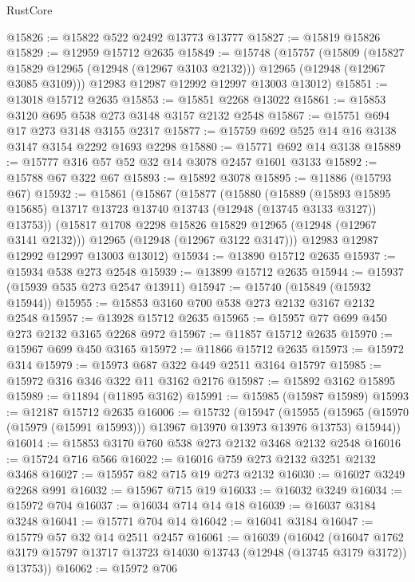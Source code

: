 \begin{lexlean}{RustCore}
\begin{coremodule}
@15826 := @15822 @522 @2492 @13773 @13777
@15827 := @15819 @15826
@15829 := @12959 @15712 @2635
@15849 := @15748
    (@15757
      (@15809
        (@15827 @15829 @12965 (@12948 (@12967 @3103 @2132)))
        @12965
        (@12948 (@12967 @3085 @3109)))
      @12983
      @12987
      @12992
      @12997
      @13003
      @13012)
@15851 := @13018 @15712 @2635
@15853 := @15851 @2268 @13022
@15861 := @15853 @3120 @695 @538 @273 @3148 @3157 @2132 @2548
@15867 := @15751 @694 @17 @273 @3148 @3155 @2317
@15877 := @15759 @692 @525 @14 @16 @3138 @3147 @3154 @2292 @1693 @2298
@15880 := @15771 @692 @14 @3138
@15889 := @15777 @316 @57 @52 @32 @14 @3078 @2457 @1601 @3133
@15892 := @15788 @67 @322 @67
@15893 := @15892 @3078
@15895 := @11886 (@15793 @67)
@15932 := @15861
    (@15867
      (@15877
        (@15880
          (@15889
            (@15893 @15895 @15685)
            @13717
            @13723
            @13740
            @13743
            (@12948 (@13745 @3133 @3127))
            @13753))
        (@15817 @1708 @2298 @15826 @15829 @12965 (@12948 (@12967 @3141 @2132)))
        @12965
        (@12948 (@12967 @3122 @3147)))
      @12983
      @12987
      @12992
      @12997
      @13003
      @13012)
@15934 := @13890 @15712 @2635
@15937 := @15934 @538 @273 @2548
@15939 := @13899 @15712 @2635
@15944 := @15937 (@15939 @535 @273 @2547 @13911)
@15947 := @15740 (@15849 (@15932 @15944))
@15955 := @15853 @3160 @700 @538 @273 @2132 @3167 @2132 @2548
@15957 := @13928 @15712 @2635
@15965 := @15957 @77 @699 @450 @273 @2132 @3165 @2268 @972
@15967 := @11857 @15712 @2635
@15970 := @15967 @699 @450 @3165
@15972 := @11866 @15712 @2635
@15973 := @15972 @314
@15979 := @15973 @687 @322 @449 @2511 @3164 @15797
@15985 := @15972 @316 @346 @322 @11 @3162 @2176
@15987 := @15892 @3162 @15895
@15989 := @11894 (@11895 @3162)
@15991 := @15985 (@15987 @15989)
@15993 := @12187 @15712 @2635
@16006 := @15732
    (@15947
      (@15955 (@15965 (@15970 (@15979 (@15991 @15993))) @13967 @13970 @13973 @13976 @13753) @15944))
@16014 := @15853 @3170 @760 @538 @273 @2132 @3468 @2132 @2548
@16016 := @15724 @716 @566
@16022 := @16016 @759 @273 @2132 @3251 @2132 @3468
@16027 := @15957 @82 @715 @19 @273 @2132
@16030 := @16027 @3249 @2268 @991
@16032 := @15967 @715 @19
@16033 := @16032 @3249
@16034 := @15972 @704
@16037 := @16034 @714 @14 @18
@16039 := @16037 @3184 @3248
@16041 := @15771 @704 @14
@16042 := @16041 @3184
@16047 := @15779 @57 @32 @14 @2511 @2457
@16061 := @16039
    (@16042
      (@16047 @1762 @3179 @15797 @13717 @13723 @14030 @13743 (@12948 (@13745 @3179 @3172)) @13753))
@16062 := @15972 @706

\end{coremodule}
\end{lexlean}
